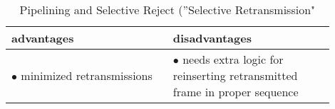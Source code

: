 \documentclass[a4paper,12pt]{article}
\begin{document}
	\begin{table}[h!]
		\caption{Pipelining and Selective Reject (''Selective Retransmission"}
		\begin{tabular}{p{0.45\linewidth}|p{0.45\linewidth}}
			advantages & disadvantages \\ \hline
			$\bullet$ minimized retransmissions &  $\bullet$ needs extra logic for reinserting retransmitted frame in proper sequence\\
		\end{tabular}
	\end{table}


	
\end{document}
